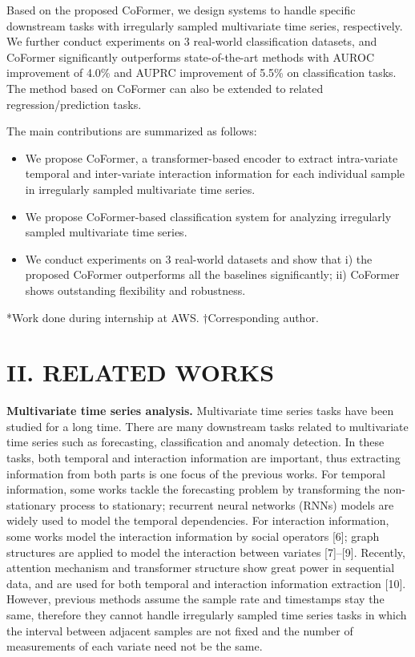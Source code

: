 \documentclass[twocolumn]{article}
\begin{document}
Based on the proposed CoFormer, we design systems to handle specific downstream tasks with irregularly sampled multivariate time series, respectively. We further conduct experiments on 3 real-world classification datasets, and CoFormer significantly outperforms state-of-the-art methods with AUROC improvement of 4.0\% and AUPRC improvement of 5.5\% on classification tasks. The method based on CoFormer can also be extended to related regression/prediction tasks.

The main contributions are summarized as follows:
\begin{itemize}
    \item We propose CoFormer, a transformer-based encoder to extract intra-variate temporal and inter-variate interaction information for each individual sample in irregularly sampled multivariate time series.
    \item We propose CoFormer-based classification system for analyzing irregularly sampled multivariate time series.
    \item We conduct experiments on 3 real-world datasets and show that i) the proposed CoFormer outperforms all the baselines significantly; ii) CoFormer shows outstanding flexibility and robustness.
\end{itemize}

\vspace{2cm}
\begin{flushleft}
*Work done during internship at AWS. \quad $\dagger$Corresponding author.
\end{flushleft}

\section*{II. RELATED WORKS}

\textbf{Multivariate time series analysis.} Multivariate time series tasks have been studied for a long time. There are many downstream tasks related to multivariate time series such as forecasting, classification and anomaly detection. In these tasks, both temporal and interaction information are important, thus extracting information from both parts is one focus of the previous works. For temporal information, some works tackle the forecasting problem by transforming the non-stationary process to stationary; recurrent neural networks (RNNs) models are widely used to model the temporal dependencies. For interaction information, some works model the interaction information by social operators [6]; graph structures are applied to model the interaction between variates [7]--[9]. Recently, attention mechanism and transformer structure show great power in sequential data, and are used for both temporal and interaction information extraction [10]. However, previous methods assume the sample rate and timestamps stay the same, therefore they cannot handle irregularly sampled time series tasks in which the interval between adjacent samples are not fixed and the number of measurements of each variate need not be the same.
\end{document}
